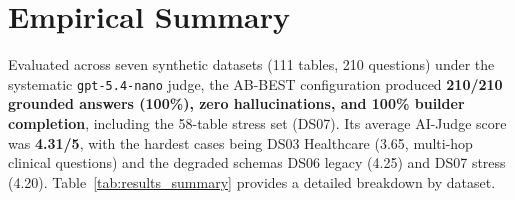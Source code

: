 \section{Empirical Summary}
\label{sec:conclusion:empirical}

Evaluated across seven synthetic datasets (111 tables, 210 questions) under the systematic \texttt{gpt-5.4-nano} judge, the AB-BEST configuration produced \textbf{210/210 grounded answers (100\%), zero hallucinations, and 100\% builder completion}, including the 58-table stress set (DS07). Its average AI-Judge score was \textbf{4.31/5}, with the hardest cases being DS03 Healthcare (3.65, multi-hop clinical questions) and the degraded schemas DS06 legacy (4.25) and DS07 stress (4.20). Table~\ref{tab:results_summary} provides a detailed breakdown by dataset.

\begin{table}[H]
\centering
\caption{AB-BEST Evaluation Results Across All Datasets (K5 configuration)}
\label{tab:results_summary}
\end{table}

